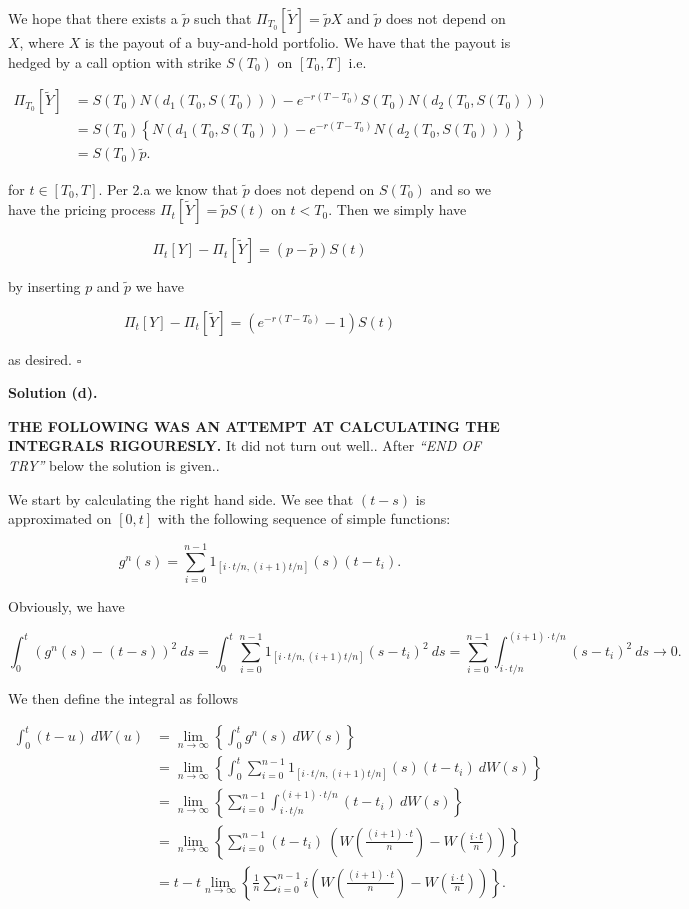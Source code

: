\documentclass[
]{book}
\begin{document}
We hope that there exists a \(\tilde{p}\) such that \(\Pi_{T_0}[\widetilde{Y}]=\tilde{p}X\) and \(\tilde{p}\) does not depend on \(X\), where \(X\) is the payout of a buy-and-hold portfolio. We have that the payout is hedged by a call option with strike \(S(T_0)\) on \([T_0,T]\) i.e.

\begin{align*}
\Pi_{T_0}[\widetilde{Y}]&=S(T_0)N(d_1(T_0,S(T_0)))-e^{-r(T-T_0)}S(T_0)N(d_2(T_0,S(T_0)))\\
&=S(T_0)\left\{N(d_1(T_0,S(T_0)))-e^{-r(T-T_0)}N(d_2(T_0,S(T_0)))\right\}\\
&=S(T_0)\tilde{p}.
\end{align*}

for \(t\in[T_0,T]\). Per 2.a we know that \(\tilde{p}\) does not depend on \(S(T_0)\) and so we have the pricing process \(\Pi_t[\widetilde{Y}]=\tilde{p}S(t)\) on \(t<T_0\). Then we simply have

\[
\Pi_t[Y]-\Pi_t[\widetilde{Y}]=(p-\tilde{p})S(t)
\]

by inserting \(p\) and \(\tilde{p}\) we have

\[
\Pi_t[Y]-\Pi_t[\widetilde{Y}]=(e^{-r(T-T_0)}-1)S(t)
\]

as desired. \(\square\)

\noindent\makebox[\linewidth]{\rule{\textwidth}{0.4pt}}

\textbf{Solution (d).}

\textbf{THE FOLLOWING WAS AN ATTEMPT AT CALCULATING THE INTEGRALS RIGOURESLY.} It did not turn out well.. After \emph{``END OF TRY''} below the solution is given..

We start by calculating the right hand side. We see that \((t-s)\) is approximated on \([0,t]\) with the following sequence of simple functions:

\[
g^n(s)=\sum_{i=0}^{n-1}1_{[i\cdot t/n,(i+1)t/n]}(s)(t-t_i).
\]

Obviously, we have

\[
\int_0^t(g^n(s)-(t-s))^2\ ds=\int_0^t \sum_{i=0}^{n-1}1_{[i\cdot t/n,(i+1)t/n]}(s-t_i)^2\ ds=\sum_{i=0}^{n-1}\int_{i\cdot t/n}^{(i+1)\cdot t/n}(s-t_i)^2\ ds\to 0.
\]

We then define the integral as follows

\begin{align*}
\int_0^t(t-u)\ dW(u)&=\lim_{n\to \infty}\left\{\int_0^tg^n(s)\ dW(s)\right\}\\
&=\lim_{n\to \infty}\left\{\int_0^t \sum_{i=0}^{n-1}1_{[i\cdot t/n,(i+1)t/n]}(s)(t-t_i)\ dW(s)\right\}\\
&=\lim_{n\to \infty}\left\{\sum_{i=0}^{n-1}\int_{i\cdot t/n}^{(i+1)\cdot t/n} (t-t_i)\ dW(s)\right\}\\
&=\lim_{n\to \infty}\left\{\sum_{i=0}^{n-1} (t-t_i)\ \left(W\left(\frac{(i+1)\cdot t}{n}\right)-W\left(\frac{i\cdot t}{n}\right)\right)\right\}\\
&=t-t\lim_{n\to \infty}\left\{\frac{1}{n}\sum_{i=0}^{n-1} i \left(W\left(\frac{(i+1)\cdot t}{n}\right)-W\left(\frac{i\cdot t}{n}\right)\right)\right\}.
\end{align*}
\end{document}
